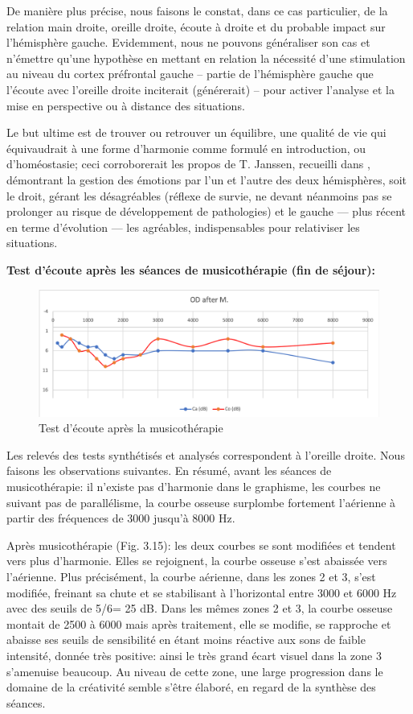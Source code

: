 De manière plus précise, nous faisons le constat, dans ce cas
particulier,  de la relation main droite, oreille droite, écoute
à droite et du probable impact sur l'hémisphère gauche.
Evidemment, nous ne pouvons généraliser son cas et 
n'émettre qu'une hypothèse
en mettant en relation la nécessité d'une stimulation au niveau du cortex préfrontal
gauche -- partie de l'hémisphère gauche que l'écoute avec
l'oreille droite inciterait (générerait) -- pour activer l'analyse et la
mise en perspective ou à distance des situations.

Le but ultime est de trouver ou
retrouver un équilibre, une qualité de vie qui équivaudrait à une forme d'harmonie comme formulé en 
introduction, ou d'homéostasie;  ceci
corroborerait les
propos de T. Janssen, recueilli dans  \autocite {van_eersel_cerveau}, démontrant la gestion des 
émotions par
l'un et l'autre des deux hémisphères, soit le droit,  gérant les désagréables
(réflexe de survie, ne devant néanmoins pas se prolonger au risque de
développement de pathologies)
et  le gauche --- plus récent en terme d'évolution ---  les
agréables, indispensables pour relativiser les situations.

\textbf{ Test d'écoute après les séances de musicothérapie (fin de séjour):}



\begin{figure}[h]
	\centering
	
	\includegraphics[width=0.7\linewidth]{images/clinique/od_after_m.png}
	\caption{Test d'écoute après la musicothérapie}
	\label{fig:odaftermeyer}
\end{figure}
Les relevés des tests synthétisés et analysés correspondent à l'oreille droite.
Nous faisons les observations suivantes.
En résumé, avant les séances de musicothérapie: il n'existe pas d'harmonie dans le graphisme, les 
courbes ne suivant pas de 
parallélisme, la courbe osseuse  surplombe fortement l'aérienne 
à partir des fréquences de 3000 jusqu'à 8000 Hz.


Après musicothérapie (Fig. 3.15): les deux courbes se sont modifiées et tendent vers plus d'harmonie.
Elles se rejoignent, la courbe osseuse s'est abaissée vers l'aérienne.
 Plus précisément, la courbe aérienne, dans les
zones 2 et 3,  s'est modifiée, freinant sa
chute et se stabilisant à l'horizontal entre 3000 et 6000 Hz
avec des seuils de 5/6= 25 dB.
Dans les mêmes zones 2 et 3, la
courbe osseuse montait de 2500 à 6000 mais après traitement,
elle se modifie, se rapproche et abaisse ses seuils de
sensibilité en étant moins réactive aux sons de faible
intensité, donnée très positive: ainsi le très grand écart visuel dans la zone 3 s'amenuise beaucoup. Au 
niveau de cette
zone, une large progression dans
le domaine de la créativité semble s'être élaboré, en regard de la synthèse des séances. 


